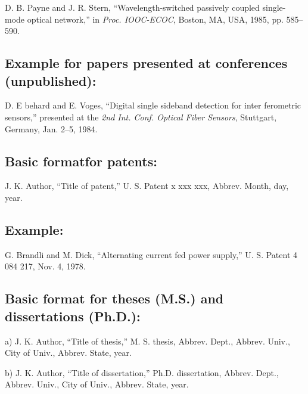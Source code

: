 \begin{thebibliography}{34}
\setcounter{enumiv}{21}

\bibitem{}D. B. Payne and J. R. Stern, ``Wavelength-switched passively coupled single-mode optical network,'' in {\em Proc. IOOC-ECOC}, Boston, MA, USA, 1985,
pp. 585--590.

\end{thebibliography}

\subsection*{Example for papers presented at conferences (unpublished):}

\begin{thebibliography}{34}
\setcounter{enumiv}{22}

\bibitem{}D. E behard and E. Voges, ``Digital single sideband detection for inter ferometric sensors,'' presented at the {\em 2nd Int. Conf. Optical Fiber Sensors}, Stuttgart, Germany, Jan. 2--5, 1984.
\end{thebibliography}

\subsection*{Basic formatfor patents:}

J. K. Author, ``Title of patent,'' U. S. Patent x xxx xxx, Abbrev. Month, day, year.

\subsection*{Example:}

\begin{thebibliography}{34}
\setcounter{enumiv}{23}

\bibitem{}G. Brandli and M. Dick, ``Alternating current fed power supply,'' U. S. Patent 4 084 217, Nov. 4, 1978.
\end{thebibliography}

\subsection*{Basic format for theses (M.S.) and dissertations (Ph.D.):}

a) J. K. Author, ``Title of thesis,'' M. S. thesis, Abbrev. Dept., Abbrev. Univ., City of Univ., Abbrev. State, year.

b) J. K. Author, ``Title of dissertation,'' Ph.D. dissertation, Abbrev. Dept., Abbrev. Univ., City of Univ., Abbrev. State, year.

